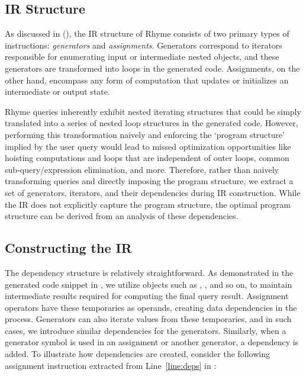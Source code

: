 \documentclass[runningheads]{llncs}
\newcommand{\lang}{Rhyme}
\begin{document}
\vspace{-3mm}
\subsection{IR Structure}\label{subsec:ir}

As discussed in  (), the IR structure of \lang{} consists of two
primary types of instructions: \emph{generators} and \emph{assignments}.
Generators correspond to iterators responsible for enumerating input or intermediate
nested objects, and these generators are transformed into loops in the generated code.
Assignments, on the other hand, encompass any form of computation that updates or
initializes an intermediate or output state.

\lang{} queries inherently exhibit nested iterating structures that could be simply
translated into a series of nested loop structures in the generated code.
However, performing this transformation naively and enforcing the `program structure'
implied by the user query would lead to missed optimization opportunities like
hoisting computations and loops that are independent of outer loops,
common sub-query/expression elimination, and more.
Therefore, rather than naively transforming queries and directly imposing the program
structure, we extract a set of generators, iterators, and their dependencies during
IR construction.
While the IR does not explicitly capture the program structure, the optimal program
structure can be derived from an analysis of these dependencies.

\subsection{Constructing the IR}

The dependency structure is relatively straightforward.
As demonstrated in the generated code snippet in , we utilize objects such
as , , and so on, to maintain intermediate results required
for computing the final query result.
Assignment operators have these temporaries as operands, creating data dependencies in the
process.
Generators can also iterate values from these temporaries, and in such cases, we introduce
similar dependencies for the generators.
Similarly, when a generator symbol is used in an assignment or another generator, a
dependency is added.
To illustrate how dependencies are created, consider the following assignment instruction
extracted from Line~\ref{line:deps} in :
\end{document}
